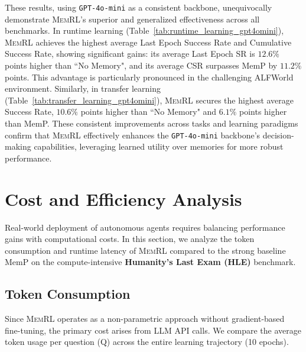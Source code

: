 \documentclass{article}
\theoremstyle{plain}
\theoremstyle{definition}
\theoremstyle{remark}
\begin{document}
These results, using \texttt{GPT-4o-mini} as a consistent backbone, unequivocally demonstrate \textsc{MemRL}'s superior and generalized effectiveness across all benchmarks. In runtime learning (Table~\ref{tab:runtime_learning_gpt4omini}), \textsc{MemRL} achieves the highest average Last Epoch Success Rate and Cumulative Success Rate, showing significant gains: its average Last Epoch SR is $12.6\%$ points higher than ``No Memory", and its average CSR surpasses MemP by $11.2\%$ points. This advantage is particularly pronounced in the challenging ALFWorld environment. Similarly, in transfer learning (Table~\ref{tab:transfer_learning_gpt4omini}), \textsc{MemRL} secures the highest average Success Rate, $10.6\%$  points higher than ``No Memory" and $6.1\%$ points higher than MemP. These consistent improvements across tasks and learning paradigms confirm that \textsc{MemRL} effectively enhances the \texttt{GPT-4o-mini} backbone's decision-making capabilities, leveraging learned utility over memories for more robust performance.


\section{Cost and Efficiency Analysis}
\label{app:efficiency_analysis}

Real-world deployment of autonomous agents requires balancing performance gains with computational costs. In this section, we analyze the token consumption and runtime latency of \textsc{MemRL} compared to the strong baseline MemP on the compute-intensive \textbf{Humanity's Last Exam (HLE)} benchmark.

\subsection{Token Consumption}

Since \textsc{MemRL} operates as a non-parametric approach without gradient-based fine-tuning, the primary cost arises from LLM API calls. We compare the average token usage per question (Q) across the entire learning trajectory (10 epochs).

\end{document}
